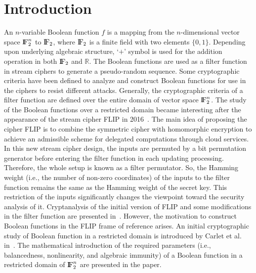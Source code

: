 \documentclass{article}[12pt]
\newcommand{\FF}{{\rm I\!F}}
\begin{document}
\section{Introduction}\label{sec:intr}
An $n$-variable Boolean function $f$ is a mapping from the $n$-dimensional vector space $\FF_2^n$ to $\FF_2$, where $\FF_2$ is a finite field with two elements $\{0,1\}$. Depending upon underlying algebraic structure, `$+$' symbol is used for the addition operation in both $\FF_2$ and $\mathbb{R}$.
The Boolean functions are used as a filter function in stream ciphers to generate a pseudo-random sequence. Some cryptographic criteria have been defined to analyze and construct Boolean functions for use in the ciphers to resist different attacks. Generally, the cryptographic criteria of a filter function are defined over the entire domain of vector space $\FF_2^n$. The study of the Boolean functions over a restricted domain became interesting after the appearance of the stream cipher FLIP in 2016~\cite{MJSC16}. The main idea of proposing the cipher FLIP is to combine the symmetric cipher with homomorphic encryption to achieve an admissible scheme for delegated computations through cloud services. In this new stream cipher design, the inputs are permuted by a bit permutation generator before entering the filter function in each updating processing. Therefore, the whole setup is known as a filter permutator. So, the Hamming weight (i.e., the number of non-zero coordinates) of the inputs to the filter function remains the same as the Hamming weight of the secret key. This restriction of the inputs significantly changes the viewpoint toward the security analysis of it. Cryptanalysis of the initial version of FLIP and some modifications in the filter function are presented in~\cite{DLR16}. However, the motivation to construct Boolean functions in the FLIP frame of reference arises. An initial cryptographic study of Boolean function in a restricted domain is introduced by Carlet et al. in~\cite{CMR17}. The mathematical introduction of the required parameters (i.e., balancedness, nonlinearity, and algebraic immunity) of a Boolean function in a restricted domain of $\FF_2^n$ are presented in the paper. 
\end{document}

